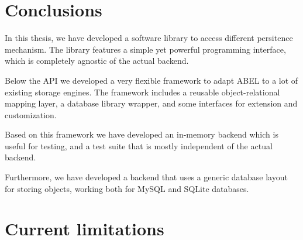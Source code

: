 \section{Conclusions}

In this thesis, we have developed a software library to access different persitence mechanism.
The library features a simple yet powerful programming interface, which is completely agnostic of the actual backend.

Below the API we developed a very flexible framework to adapt ABEL to a lot of existing storage engines.
The framework includes a reusable object-relational mapping layer, a database library wrapper, and some interfaces for extension and customization.

Based on this framework we have developed an in-memory backend which is useful for testing, and a test suite that is mostly independent of the actual backend.

Furthermore, we have developed a backend that uses a generic data\-base layout for storing objects, working both for MySQL and SQLite data\-bases.

\section{Current limitations}

